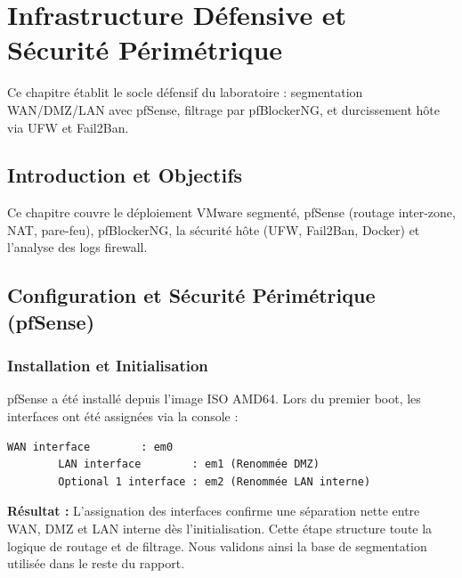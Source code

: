 \documentclass[12pt,a4paper,openany]{report}
\begin{document}
	\chapter{Infrastructure Défensive et Sécurité Périmétrique}
	\label{chap:infrastructure}
	
	\begin{tcolorbox}[colback=primary!5!white, colframe=primary, title=\textbf{Objectifs du Chapitre}]
		Ce chapitre établit le socle défensif du laboratoire : segmentation WAN/DMZ/LAN avec pfSense, filtrage par pfBlockerNG, et durcissement hôte via UFW et Fail2Ban.
	\end{tcolorbox}
	
	\section{Introduction et Objectifs}
	
	Ce chapitre couvre le déploiement VMware segmenté, pfSense (routage inter-zone, NAT, pare-feu), pfBlockerNG, la sécurité hôte (UFW, Fail2Ban, Docker) et l'analyse des logs firewall.
	
	\section{Configuration et Sécurité Périmétrique (pfSense)}
	
	
	\subsection{Installation et Initialisation}
	pfSense a été installé depuis l'image ISO AMD64. Lors du premier boot, les interfaces ont été assignées via la console :
	\begin{lstlisting}[caption=Assignation des Interfaces en Console]
		WAN interface        : em0
		LAN interface        : em1 (Renommée DMZ)
		Optional 1 interface : em2 (Renommée LAN interne)
	\end{lstlisting}
	\textbf{Résultat :} L’assignation des interfaces confirme une séparation nette entre WAN, DMZ et LAN interne dès l’initialisation. Cette étape structure toute la logique de routage et de filtrage. Nous validons ainsi la base de segmentation utilisée dans le reste du rapport.
	
\end{document}
